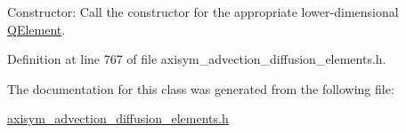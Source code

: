 Constructor\+: Call the constructor for the appropriate lower-\/dimensional \hyperlink{classoomph_1_1QElement}{Q\+Element}. 



Definition at line 767 of file axisym\+\_\+advection\+\_\+diffusion\+\_\+elements.\+h.



The documentation for this class was generated from the following file\+:\begin{DoxyCompactItemize}
\item 
\hyperlink{axisym__advection__diffusion__elements_8h}{axisym\+\_\+advection\+\_\+diffusion\+\_\+elements.\+h}\end{DoxyCompactItemize}
